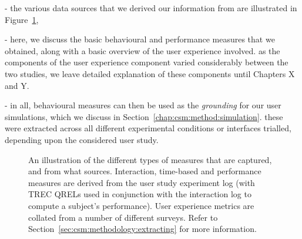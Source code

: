 - the various data sources that we derived our information from are illustrated in Figure~\ref{fig:evaluation_methodology},


- here, we discuss the basic behavioural and performance measures that we obtained, along with a basic overview of the user experience involved. as the components of the user experience component varied considerably between the two studies, we leave detailed explanation of these components until Chapters X and Y.

- in all, behavioural measures can then be used as the \emph{grounding} for our user simulations, which we discuss in Section~\ref{chap:csm:method:simulation}. these were extracted across all different experimental conditions or interfaces trialled, depending upon the considered user study.


\begin{figure}[t!]
    \centering
    \caption[Examples of Evaluation Measures]{An illustration of the different types of measures that are captured, and from what sources. Interaction, time-based and performance measures are derived from the user study experiment log (with TREC QRELs used in conjunction with the interaction log to compute a subject's performance). User experience metrics are collated from a number of different surveys. Refer to Section~\ref{sec:csm:methodology:extracting} for more information.}
    \label{fig:evaluation_methodology}
\end{figure}

